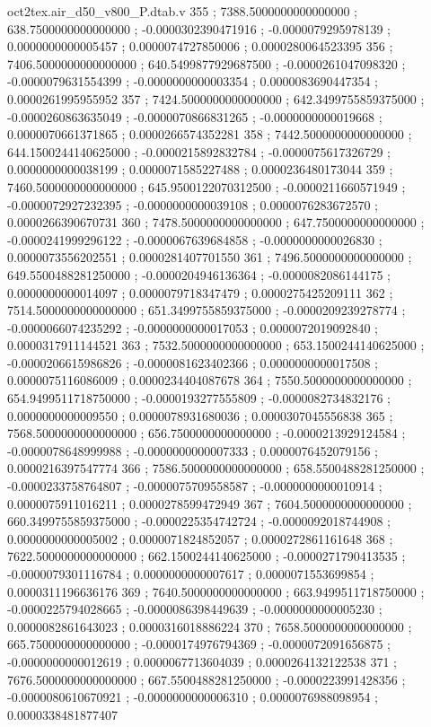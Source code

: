 \begin{filecontents}[overwrite]{oct2tex.air_d50_v800_P.dtab.v}
355 ; 7388.5000000000000000 ; 638.7500000000000000 ; -0.0000302390471916 ; -0.0000079295978139 ; 0.0000000000005457 ; 0.0000074727850006 ; 0.0000280064523395
356 ; 7406.5000000000000000 ; 640.5499877929687500 ; -0.0000261047098320 ; -0.0000079631554399 ; -0.0000000000003354 ; 0.0000083690447354 ; 0.0000261995955952
357 ; 7424.5000000000000000 ; 642.3499755859375000 ; -0.0000260863635049 ; -0.0000070866831265 ; -0.0000000000019668 ; 0.0000070661371865 ; 0.0000266574352281
358 ; 7442.5000000000000000 ; 644.1500244140625000 ; -0.0000215892832784 ; -0.0000075617326729 ; 0.0000000000038199 ; 0.0000071585227488 ; 0.0000236480173044
359 ; 7460.5000000000000000 ; 645.9500122070312500 ; -0.0000211660571949 ; -0.0000072927232395 ; -0.0000000000039108 ; 0.0000076283672570 ; 0.0000266390670731
360 ; 7478.5000000000000000 ; 647.7500000000000000 ; -0.0000241999296122 ; -0.0000067639684858 ; -0.0000000000026830 ; 0.0000073556202551 ; 0.0000281407701550
361 ; 7496.5000000000000000 ; 649.5500488281250000 ; -0.0000204946136364 ; -0.0000082086144175 ; 0.0000000000014097 ; 0.0000079718347479 ; 0.0000275425209111
362 ; 7514.5000000000000000 ; 651.3499755859375000 ; -0.0000209239278774 ; -0.0000066074235292 ; -0.0000000000017053 ; 0.0000072019092840 ; 0.0000317911144521
363 ; 7532.5000000000000000 ; 653.1500244140625000 ; -0.0000206615986826 ; -0.0000081623402366 ; 0.0000000000017508 ; 0.0000075116086009 ; 0.0000234404087678
364 ; 7550.5000000000000000 ; 654.9499511718750000 ; -0.0000193277555809 ; -0.0000082734832176 ; 0.0000000000009550 ; 0.0000078931680036 ; 0.0000307045556838
365 ; 7568.5000000000000000 ; 656.7500000000000000 ; -0.0000213929124584 ; -0.0000078648999988 ; -0.0000000000007333 ; 0.0000076452079156 ; 0.0000216397547774
366 ; 7586.5000000000000000 ; 658.5500488281250000 ; -0.0000233758764807 ; -0.0000075709558587 ; -0.0000000000010914 ; 0.0000075911016211 ; 0.0000278599472949
367 ; 7604.5000000000000000 ; 660.3499755859375000 ; -0.0000225354742724 ; -0.0000092018744908 ; 0.0000000000005002 ; 0.0000071824852057 ; 0.0000272861161648
368 ; 7622.5000000000000000 ; 662.1500244140625000 ; -0.0000271790413535 ; -0.0000079301116784 ; 0.0000000000007617 ; 0.0000071553699854 ; 0.0000311196636176
369 ; 7640.5000000000000000 ; 663.9499511718750000 ; -0.0000225794028665 ; -0.0000086398449639 ; -0.0000000000005230 ; 0.0000082861643023 ; 0.0000316018886224
370 ; 7658.5000000000000000 ; 665.7500000000000000 ; -0.0000174976794369 ; -0.0000072091656875 ; -0.0000000000012619 ; 0.0000067713604039 ; 0.0000264132122538
371 ; 7676.5000000000000000 ; 667.5500488281250000 ; -0.0000223991428356 ; -0.0000080610670921 ; -0.0000000000006310 ; 0.0000076988098954 ; 0.0000338481877407

\end{filecontents}
